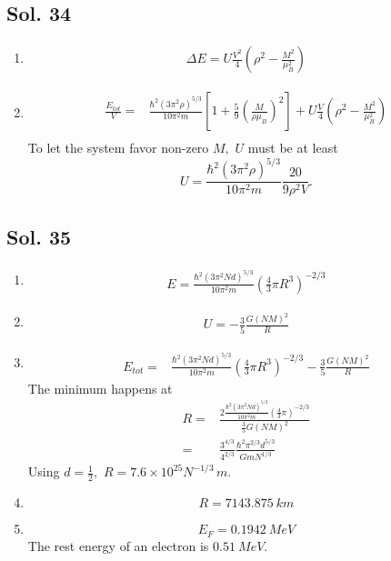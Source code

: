    \subsection*{Sol. 34}
   \begin{enumerate}
       \item 
       \begin{align*}
           \Delta E = U\frac{V^2}{4}
           \left(\rho^2 - \frac{M^2}{\mu_B^2}\right)
       \end{align*}
       \item 
       \begin{align*}
           \frac{E_{tot}}{V} =& \frac{\hbar^2(3\pi^2\rho)^{5/3}}{10\pi^2m}
           \left[
           1+\frac{5}{9}\left( \frac{M}{\rho\mu_B}\right)^2
           \right]
           +U\frac{V}{4}
           \left(\rho^2 - \frac{M^2}{\mu_B^2}\right)\\
       \end{align*}
       To let the system favor non-zero $M,$ $U$ must be at least
       $$
       U=\frac{\hbar^2(3\pi^2\rho)^{5/3}}{10\pi^2m}
       \frac{20}{9\rho^2V}.
       $$
   \end{enumerate}
   \subsection*{Sol. 35}
   \begin{enumerate}
       \item 
       \begin{align*}
           E=\frac{\hbar^2(3\pi^2 Nd)^{5/3}}{10\pi^2m}(\frac{4}{3}\pi R^3)^{-2/3}
       \end{align*}
       \item 
       \begin{align*}
           U=-\frac{3}{5}\frac{G(NM)^2}{R}
       \end{align*}
       \item 
       \begin{align*}
           E_{tot} = &
           \frac{\hbar^2(3\pi^2 Nd)^{5/3}}{10\pi^2m}(\frac{4}{3}\pi R^3)^{-2/3} -\frac{3}{5}\frac{G(NM)^2}{R}
       \end{align*}
       The minimum happens at 
       \begin{align*}
           R =& \frac{2\frac{\hbar^2(3\pi^2 Nd)^{5/3}}{10\pi^2m}(\frac{4}{3}\pi )^{-2/3}}
           {\frac{3}{5}G(NM)^2}\\
           =&
           \frac{3^{4/3}}{4^{2/3}}\frac{\hbar^2\pi^{2/3}d^{5/3}}{GmN^{1/3}}
       \end{align*}
       Using $d = \frac{1}{2},$ $R=7.6\times 10^{25}N^{-1/3}\,\unit{m}.$
       \item $$R = \qty{7143.875}{km}$$
       \item 
       $$
       E_F= \qty{0.1942}{MeV}
       $$
       The rest energy of an electron is $\qty{0.51}{MeV}.$
   \end{enumerate}
